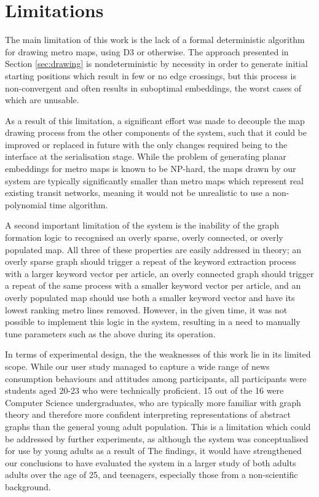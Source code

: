 \section{Limitations}

The main limitation of this work is the lack of a formal deterministic algorithm for drawing metro maps, using D3 or otherwise. The approach presented in Section \ref{sec:drawing} is nondeterministic by necessity in order to generate initial starting positions which result in few or no edge crossings, but this process is non-convergent and often results in suboptimal embeddings, the worst cases of which are unusable. 

As a result of this limitation, a significant effort was made to decouple the map drawing process from the other components of the system, such that it could be improved or replaced in future with the only changes required being to the interface at the serialisation stage. While the problem of generating planar embeddings for metro maps is known to be NP-hard, the maps drawn by our system are typically significantly smaller than metro maps which represent real existing transit networks, meaning it would not be unrealistic to use a non-polynomial time algorithm.

A second important limitation of the system is the inability of the graph formation logic to recognised an overly sparse, overly connected, or overly populated map. All three of these properties are easily addressed in theory; an overly sparse graph should trigger a repeat of the keyword extraction process with a larger keyword vector per article, an overly connected graph should trigger a repeat of the same process with a smaller keyword vector per article, and an overly populated map should use both a smaller keyword vector and have its lowest ranking metro lines removed. However, in the given time, it was not possible to implement this logic in the system, resulting in a need to manually tune parameters such as the above during its operation.

In terms of experimental design, the the weaknesses of this work lie in its limited scope. While our user study managed to capture a wide range of news consumption behaviours and attitudes among participants, all participants were students aged 20-23 who were technically proficient. 15 out of the 16 were Computer Science undergraduates, who are typically more familiar with graph theory and therefore more confident interpreting representations of abstract graphs than the general young adult population. This is a limitation which could be addressed by further experiments, as although the system was conceptualised for use by young adults as a result of The  findings, it would have strengthened our conclusions to have evaluated the system in a larger study of both adults adults over the age of 25, and teenagers, especially those from a non-scientific background.


